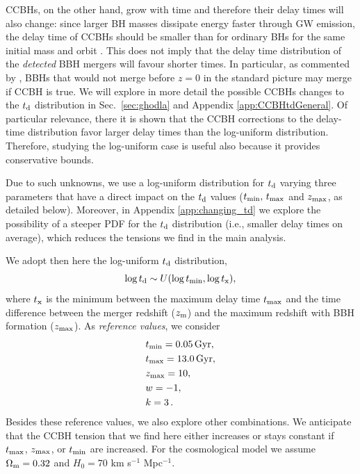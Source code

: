 \documentclass[fleqn,usenatbib,useAMS]{mnras}
\begin{document}
CCBHs, on the other hand, grow with time and therefore their delay times will also change: since larger BH masses dissipate energy faster through GW emission, the delay time of CCBHs should be smaller than for ordinary BHs for the same initial mass and orbit \citep{Croker:2020plg, Farrah:2023opk,Ghodla:2023iaz}. This does not imply that the delay time distribution of the \textit{detected} BBH mergers will favour shorter times.
In particular, as commented by \citet{Farrah:2023opk, Ghodla:2023iaz}, BBHs that would not merge before $z=0$ in the standard picture may merge if CCBH is true.  We will explore in more detail the possible CCBHs changes to the $t_{\rm d}$ distribution in Sec.~\ref{sec:ghodla} and Appendix \ref{app:CCBHtdGeneral}. Of particular relevance, there it is shown that the CCBH corrections to the delay-time distribution favor larger delay times than the log-uniform distribution. Therefore, studying the log-uniform case is useful also because  it provides conservative bounds.

Due to such unknowns, we use a log-uniform distribution for $t_{\rm d}$ varying three parameters that have a direct impact on the $t_{\rm d}$ values ($t_{\rm min}, \, t_{\rm max}$ and $z_{\rm max}$, as detailed below). Moreover, in Appendix \ref{app:changing_td} we explore the possibility of a steeper PDF for the $t_{\rm d}$ distribution (i.e., smaller delay times on average), which reduces the tensions we find in the main analysis. 

We adopt then here the log-uniform $t_{\rm d}$ distribution, 
\begin{equation}
      \log t_{\rm d} \sim U(\log t_{\rm min}, \log t_{\rm x}), \label{tdDistribution}
\end{equation}
where $t_{\rm x }$ is the minimum between the maximum delay time $t_{\rm max}$ and the time difference between the merger redshift ($z_{\rm m}$)  and the  maximum redshift with BBH formation ($z_{\rm max}$). As \textit{reference values}, we consider
\begin{align} \label{referenceValues}
    &t_{\rm min}=0.05\, {\rm Gyr}, \nonumber \\
    &t_{\rm max}=13.0\, {\rm Gyr}, \nonumber \\
    &z_{\rm max}=10, \\
    & w=-1,\nonumber\\
    & k=3\, . \nonumber
\end{align}
Besides these reference values, we also explore other combinations.  We anticipate that the CCBH tension that we find here either increases or stays constant if $t_{\rm max}$, $z_{\rm max}$, or $t_{\rm min}$ are increased. For the cosmological model we assume $\Omega_{\rm m} = 0.32$ and $H_0 = 70$ km s$^{-1}$ Mpc$^{-1}$. 
\end{document}
